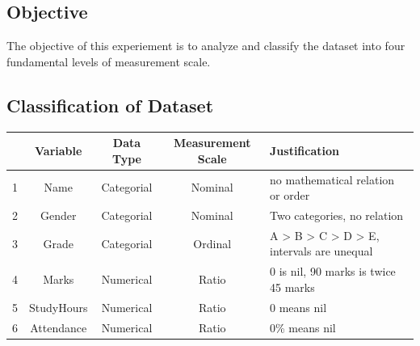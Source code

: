 %  


\subsection{Objective}
The objective of this experiement is to analyze and classify the dataset into four fundamental levels of measurement scale.


\subsection{Classification of Dataset}
\begin{tabularx}{\linewidth}{ccccX}
    \toprule
    & \textbf{Variable} & \textbf{Data Type} & \textbf{Measurement Scale} & \textbf{Justification} \\
    \midrule
    1 & Name  & Categorial & Nominal & no mathematical relation or order \\
    2 & Gender & Categorial & Nominal & Two categories, no relation \\
    3 & Grade  & Categorial & Ordinal & A > B > C > D > E, intervals are unequal \\
    4 & Marks  & Numerical & Ratio & 0 is nil, 90 marks is twice 45 marks \\
    5 & StudyHours  & Numerical & Ratio & 0 means nil \\
    6 & Attendance  & Numerical & Ratio & 0\% means nil \\

    \bottomrule
\end{tabularx}
